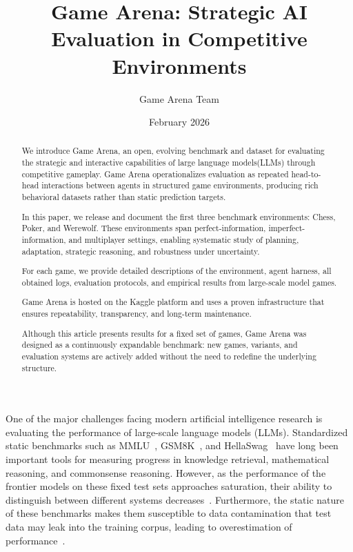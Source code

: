 \documentclass{article}
\title{Game Arena: Strategic AI Evaluation in Competitive Environments}
\author{Game Arena Team}
\date{February 2026}
\begin{document}
\maketitle

\begin{abstract}

We introduce Game Arena, an open, evolving benchmark and dataset for evaluating the strategic and interactive capabilities of large language models(LLMs) through competitive gameplay. Game Arena operationalizes evaluation as repeated head-to-head interactions between agents in structured game environments, producing rich behavioral datasets rather than static prediction targets.

In this paper, we release and document the first three benchmark environments: Chess, Poker, and Werewolf. These environments span perfect-information, imperfect-information, and multiplayer settings, enabling systematic study of planning, adaptation, strategic reasoning, and robustness under uncertainty.

For each game, we provide detailed descriptions of the environment, agent harness, all obtained logs, evaluation protocols, and empirical results from large-scale model games.

Game Arena is hosted on the Kaggle platform and uses a proven infrastructure that ensures repeatability, transparency, and long-term maintenance.

Although this article presents results for a fixed set of games, Game Arena was designed as a continuously expandable benchmark: new games, variants, and evaluation systems are actively added without the need to redefine the underlying structure.


\end{abstract}

One of the major challenges facing modern artificial intelligence research is evaluating the performance of large-scale language models (LLMs). Standardized static benchmarks such as MMLU~\citep{hendryckstest2021}, GSM8K~\citep{cobbe2021gsm8k}, and HellaSwag~\citep{zellers2019hellaswag}  have long been important tools for measuring progress in knowledge retrieval, mathematical reasoning, and commonsense reasoning.
However, as the performance of the frontier models on these fixed test sets approaches saturation, their ability to distinguish between different systems decreases~\citep{white2024livebench}. Furthermore, the static nature of these benchmarks makes them susceptible to data contamination that test data may leak into the training corpus, leading to overestimation of performance~\citep{white2024livebench, kapoor2024agents}. 
\end{document}
